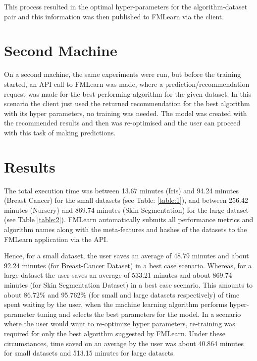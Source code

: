 This process resulted in the optimal hyper-parameters for the algorithm-dataset pair and this information was then published to FMLearn via the client.
 
\section*{Second Machine}

On a second machine, the same experiments were run, but before the training started, an API call to FMLearn was made, where a prediction/recommendation request was made for the best performing algorithm for the given dataset. In this scenario the client just used the returned recommendation for the best algorithm with its hyper parameters, no training was needed. The model was created with the recommended results and then was re-optimised and the user can proceed with this task of making predictions.

\section{Results}

The total execution time was between 13.67 minutes (Iris) and 94.24 minutes (Breast Cancer) for the small datasets (see Table: \ref{table:1}), and between 256.42 minutes (Nursery) and 869.74 minutes (Skin Segmentation) for the large dataset (see Table \ref{table:2}). FMLearn automatically submits all performance metrics and algorithm names along with the meta-features and hashes of the datasets to the FMLearn application via the API. 

Hence, for a small dataset, the user saves an average of 48.79 minutes and about 92.24 minutes (for Breast-Cancer Dataset) in a best case scenario. Whereas, for a large dataset the user saves an average of 533.21 minutes and about 869.74 minutes (for Skin Segmentation Dataset) in a best case scenario. This amounts to about 86.72\% and 95.762\% (for small and large datasets respectively) of time spent waiting by the user, when the machine learning algorithm performs hyper-parameter tuning and selects the best parameters for the model. In a scenario where the user would want to re-optimize hyper parameters, re-training was required for only the best algorithm suggested by FMLearn. Under these circumstances, time saved on an average by the user was about 40.864 minutes for small datasets and 513.15 minutes for large datasets.



